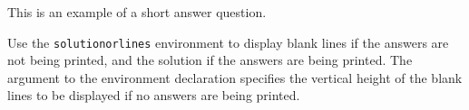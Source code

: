 
This is an example of a short answer question.

\begin{solutionorlines}[1in]

  Use the \texttt{solutionorlines} environment to display blank lines if the
  answers are not being printed, and the solution if the answers are being
  printed. The argument to the environment declaration specifies the vertical
  height of the blank lines to be displayed if no answers are being printed.

\end{solutionorlines}
